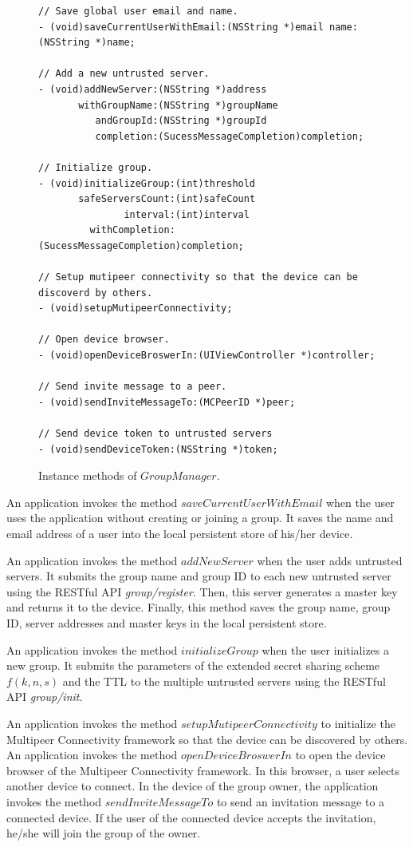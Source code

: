 \documentclass[a4paper,11pt]{report}
\begin{document}
\begin{figure}
\begin{lstlisting}[frame=none language=Objective-C] 
// Save global user email and name.
- (void)saveCurrentUserWithEmail:(NSString *)email name:(NSString *)name;

// Add a new untrusted server.
- (void)addNewServer:(NSString *)address
       withGroupName:(NSString *)groupName
          andGroupId:(NSString *)groupId
          completion:(SucessMessageCompletion)completion;

// Initialize group.
- (void)initializeGroup:(int)threshold
       safeServersCount:(int)safeCount
               interval:(int)interval
         withCompletion:(SucessMessageCompletion)completion;

// Setup mutipeer connectivity so that the device can be discoverd by others.
- (void)setupMutipeerConnectivity;

// Open device browser.
- (void)openDeviceBroswerIn:(UIViewController *)controller;

// Send invite message to a peer.
- (void)sendInviteMessageTo:(MCPeerID *)peer;

// Send device token to untrusted servers
- (void)sendDeviceToken:(NSString *)token;	
\end{lstlisting}
\caption{Instance methods of $GroupManager$.}
\label{fig:group_manager}
\end{figure}

An application invokes the method $saveCurrentUserWithEmail$ when the user uses the application without creating or joining a group.
It saves the name and email address of a user into the local persistent store of his/her device.

An application invokes the method $addNewServer$ when the user adds untrusted servers. 
It submits the group name and group ID to each new untrusted server using the RESTful API \emph{group/register}.
Then, this server generates a master key and returns it to the device.
Finally, this method saves the group name, group ID, server addresses and master keys in the local persistent store.

An application invokes the method $initializeGroup$  when the user initializes a new group.
It submits the parameters of the extended secret sharing scheme $f(k, n, s)$ and the TTL to the multiple untrusted servers using the RESTful API \emph{group/init}.

An application invokes the method $setupMutipeerConnectivity$ to initialize the Multipeer Connectivity framework so that the device can be discovered by others.
An application invokes the method $openDeviceBroswerIn$ to open the device browser of the Multipeer Connectivity framework.
In this browser, a user selects another device to connect.
In the device of the group owner, the application invokes the method $sendInviteMessageTo$ to send an invitation message to a connected device.
If the user of the connected device accepts the invitation, he/she will join the group of the owner.
\end{document}
